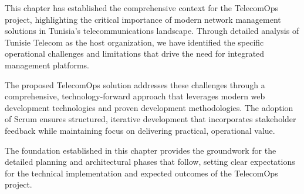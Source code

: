 This chapter has established the comprehensive context for the TelecomOps project, highlighting the critical importance of modern network management solutions in Tunisia's telecommunications landscape. Through detailed analysis of Tunisie Telecom as the host organization, we have identified the specific operational challenges and limitations that drive the need for integrated management platforms.

The proposed TelecomOps solution addresses these challenges through a comprehensive, technology-forward approach that leverages modern web development technologies and proven development methodologies. The adoption of Scrum ensures structured, iterative development that incorporates stakeholder feedback while maintaining focus on delivering practical, operational value.

The foundation established in this chapter provides the groundwork for the detailed planning and architectural phases that follow, setting clear expectations for the technical implementation and expected outcomes of the TelecomOps project.